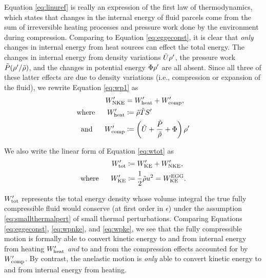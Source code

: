 \documentclass[12pt]{article}
\newcommand{\wptot}{W^\prime_{\rm tot}}
\newcommand{\wpke}{W^\prime_{\rm KE}}
\newcommand{\wpnke}{W^\prime_{\rm NKE}}
\newcommand{\wpheat}{W^\prime_{\rm heat}}
\newcommand{\wpcomp}{W^\prime_{\rm comp}}
\newcommand{\eggwke}{W^{\rm EGG}_{\rm KE}}
\begin{document}
Equation \eqref{eq:linuref} is really an expression of the first law of thermodynamics, which states that changes in the internal energy of fluid parcels come from the sum of irreversible heating processes and pressure work done by the environment during compression. Comparing to Equation \eqref{eq:eggeconst}, it is clear that \textit{only} changes in internal energy from heat sources can effect the total energy. The changes in internal energy from density variations $\tilde{U}{\rho^\prime}$, the pressure work $\tilde{P}({\rho^\prime}/\tilde{\rho})$, and the changes in potential energy $\Phi{\rho^\prime}$ are all absent. Since all three of these latter effects are due to density variations (i.e., compression or expansion of the fluid), we rewrite Equation \eqref{eq:wp1} as
\begin{subequations}\label{eq:wpnke}
	\begin{align}
		\wpnke &= \wpheat + \wpcomp,\\
		\where \wpheat&\define \rhotilde\tmptilde \entrprime\\
		\andd \wpcomp &\define \left(\intetilde+\frac{\prstilde}{\rhotilde}+\Phi\right)\rhoprime
	\end{align}
\end{subequations}

We also write the linear form of Equation \eqref{eq:wtot} as
\begin{subequations}\label{eq:wpke}
	\begin{align}
		\wptot &\define \wpke + \wpnke,\\
		\where \wpke &\define \frac{1}{2}\rhotilde u^2 = \eggwke.
	\end{align}
\end{subequations}

$\wptot$ represents the total energy density whose volume integral the true fully compressible fluid would conserve (at first order in $\epsilon$) under the assumption \eqref{eq:smallthermalpert} of small thermal perturbations. Comparing Equations \eqref{eq:eggeconst}, \eqref{eq:wpnke}, and \eqref{eq:wpke}, we see that the fully compressible motion is formally able to convert kinetic energy to and from internal energy from heating $\wpheat$ \textit{and} to and from the compression effects accounted for by $\wpcomp$. By contrast, the anelastic motion is \textit{only} able to convert kinetic energy to and from internal energy from heating.
	
\end{document}
